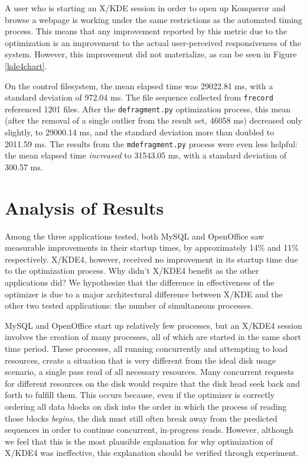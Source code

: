 \documentclass[10pt,twocolumn,letterpaper]{article}
\begin{document}
A user who is starting an X/KDE session in order to open up Konqueror and browse a webpage is working under the same restrictions as the automated timing process. This means that any improvement reported by this metric due to the optimization is an improvement to the actual user-perceived responsiveness of the system. However, this improvement
did not materialize, as can be seen in Figure \ref{kde4chart}.

On the control filesystem, the mean elapsed time was 29022.81 ms, with a standard deviation of 972.04 ms. The file sequence collected from \texttt{frecord} referenced 1201 files. After the \texttt{defragment.py} optimization process, this mean (after the removal of a single outlier from the result set, 46058 ms) decreased only slightly, to 29000.14 ms, and the standard deviation more than doubled to 2011.59 ms. The results from the \texttt{mdefragment.py} process were even less helpful: the mean elapsed time \emph{increased} to 31543.05 ms, with a standard deviation of 300.57 ms.

\section{Analysis of Results}

Among the three applications tested, both MySQL and OpenOffice saw measurable improvements in their startup times, by approximately 14\% and 11\% respectively. X/KDE4, however, received no improvement in its startup time due to the optimization process. Why didn't X/KDE4 benefit as the other applications did? We hypothesize that the difference in effectiveness of the optimizer is due to a major architectural difference between X/KDE and the other two tested applications: the number of simultaneous processes.

MySQL and OpenOffice start up relatively few processes, but an X/KDE4 session involves the creation of many processes, all of which are started in the same short time period. These processes, all running concurrently and attempting to load resources, create a situation that is very different from the ideal disk usage scenario, a single pass read of all necessary resources. Many concurrent requests for different resources on the disk would require that the disk head seek back and forth to fulfill them. This occurs because, even if the optimizer is correctly ordering all data blocks on disk into the order in which the process of reading those blocks \emph{begins}, the disk must still often break away from the predicted sequences in order to continue concurrent, in-progress reads. However, although we feel that this is the most plausible explanation for why optimization of X/KDE4 was ineffective, this explanation should be verified through experiment.
\end{document}
